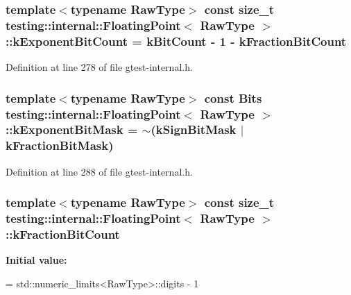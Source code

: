 \subsubsection[{\texorpdfstring{k\+Exponent\+Bit\+Count}{kExponentBitCount}}]{\setlength{\rightskip}{0pt plus 5cm}template$<$typename Raw\+Type$>$ const size\+\_\+t {\bf testing\+::internal\+::\+Floating\+Point}$<$ Raw\+Type $>$\+::k\+Exponent\+Bit\+Count = {\bf k\+Bit\+Count} -\/ 1 -\/ {\bf k\+Fraction\+Bit\+Count}\hspace{0.3cm}{\ttfamily [static]}}\hypertarget{classtesting_1_1internal_1_1_floating_point_a1973d843c00781053d3073daa8a40119}{}\label{classtesting_1_1internal_1_1_floating_point_a1973d843c00781053d3073daa8a40119}


Definition at line 278 of file gtest-\/internal.\+h.

\subsubsection[{\texorpdfstring{k\+Exponent\+Bit\+Mask}{kExponentBitMask}}]{\setlength{\rightskip}{0pt plus 5cm}template$<$typename Raw\+Type$>$ const {\bf Bits} {\bf testing\+::internal\+::\+Floating\+Point}$<$ Raw\+Type $>$\+::k\+Exponent\+Bit\+Mask = $\sim$({\bf k\+Sign\+Bit\+Mask} $\vert$ {\bf k\+Fraction\+Bit\+Mask})\hspace{0.3cm}{\ttfamily [static]}}\hypertarget{classtesting_1_1internal_1_1_floating_point_a66065dfc4d5f41100f686159637af23b}{}\label{classtesting_1_1internal_1_1_floating_point_a66065dfc4d5f41100f686159637af23b}


Definition at line 288 of file gtest-\/internal.\+h.

\subsubsection[{\texorpdfstring{k\+Fraction\+Bit\+Count}{kFractionBitCount}}]{\setlength{\rightskip}{0pt plus 5cm}template$<$typename Raw\+Type$>$ const size\+\_\+t {\bf testing\+::internal\+::\+Floating\+Point}$<$ Raw\+Type $>$\+::k\+Fraction\+Bit\+Count\hspace{0.3cm}{\ttfamily [static]}}\hypertarget{classtesting_1_1internal_1_1_floating_point_a0b756a6d2a4f5f5b41ca79651c06c043}{}\label{classtesting_1_1internal_1_1_floating_point_a0b756a6d2a4f5f5b41ca79651c06c043}
{\bfseries Initial value\+:}
\begin{DoxyCode}
=
    std::numeric\_limits<RawType>::digits - 1
\end{DoxyCode}


